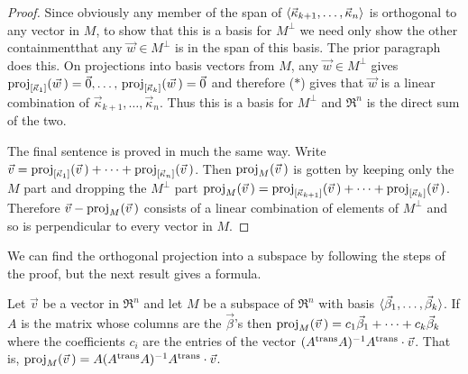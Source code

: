\begin{proof}
Since obviously any member of the span of
\( \sequence{\vec{\kappa}_{k+1},\dots,\vec{\kappa}_n} \)
is orthogonal to any vector in $M$, to show that this is a basis for $M^\perp$
we need only show the other 
containment\Dash that any $\vec{w}\in M^\perp$ is in
the span of this basis.
The prior paragraph does this.
On projections into basis vectors from $M$, any $\vec{w}\in M^\perp$ gives
$\proj{\vec{w}\,}{\spanof{\vec{\kappa}_1}}=\zero,
\dots,\,\proj{\vec{w}\,}{\spanof{\vec{\kappa}_k}}=\zero$
and therefore ($*$) gives that $\vec{w}$ is a linear combination of 
\( \vec{\kappa}_{k+1},\dots,\vec{\kappa}_n \).
Thus this is a basis for $M^\perp$ and
$\Re^n$ is the direct sum of the two.

The final sentence is proved in much the same way.
Write $\vec{v}=\proj{\vec{v}\,}{\spanof{\vec{\kappa}_1}}
           +\dots+\proj{\vec{v}\,}{\spanof{\vec{\kappa}_n}}$.
Then $\proj{\vec{v}\,}{M}$ is gotten by keeping only the $M$ part and
dropping the $M^\perp$ part
$\proj{\vec{v}\,}{M}=\proj{\vec{v}\,}{\spanof{\vec{\kappa}_{k+1}}}
                       +\dots+\proj{\vec{v}\,}{\spanof{\vec{\kappa}_k}}$.
Therefore $\vec{v}-\proj{\vec{v}\,}{M}$ consists of a linear combination
of elements of $M^\perp$ and so is perpendicular to every vector in $M$.
\end{proof}

We can find the orthogonal projection into a subspace by 
following the steps of the proof, but the next result gives a 
formula.

\begin{theorem} \label{th:OrthProjMat}
Let $\vec{v}$ be a vector in $\Re^n$ and 
let \( M \) be a subspace of \( \Re^n \) with basis
\( \sequence{\vec{\beta}_1,\dots,\vec{\beta}_k} \). 
If \( A \) is the matrix whose columns are the \( \vec{\beta} \)'s
then $\proj{\vec{v}\,}{M}=c_1\vec{\beta}_1+\dots+c_k\vec{\beta}_k$
where the coefficients $c_i$ are the entries of the vector
$(\trans{A}A)^{-1}\trans{A}\cdot\vec{v}$.
That is, 
$\proj{\vec{v}\,}{M}=A(\trans{A}A)^{-1}\trans{A}\cdot\vec{v}$.
\end{theorem}

